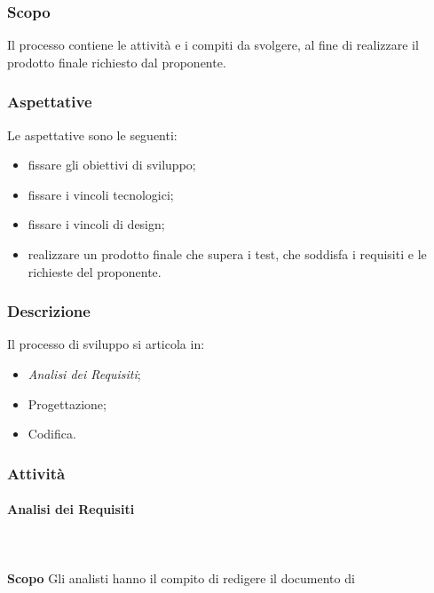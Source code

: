 \subsubsection{Scopo}
Il processo contiene le attività e i compiti da svolgere, al fine di realizzare 
il prodotto finale richiesto dal proponente.

\subsubsection{Aspettative}
Le aspettative sono le seguenti:
	\begin{itemize}
		\item fissare gli obiettivi di sviluppo;
		\item fissare i vincoli tecnologici;
		\item fissare i vincoli di design;
		\item realizzare un prodotto finale che supera i test, che soddisfa i 
			requisiti e le richieste del proponente.
	\end{itemize}
	
\subsubsection{Descrizione}
Il processo di sviluppo si articola in:
	\begin{itemize}
		\item \textit{Analisi dei Requisiti};
		\item Progettazione;
		\item Codifica.
	\end{itemize}
	
\subsubsection{Attività}
\paragraph{Analisi dei Requisiti} \mbox{}\\ \mbox{}\\
\textbf{Scopo} \newline \newline
Gli analisti hanno il compito di redigere il documento di

